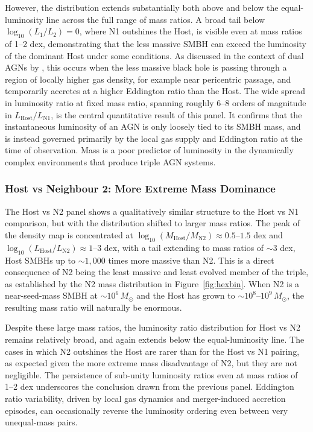 \documentclass[twocolumn, 10pt]{article}
\begin{document}
However, the distribution extends substantially both above and below the equal-luminosity line across the full range of mass ratios. A broad tail below $\log_{10}(L_1/L_2) = 0$, where N1 outshines the Host, is visible even at mass ratios of 1--2 dex, demonstrating that the less massive SMBH can exceed the luminosity of the dominant Host under some conditions. As discussed in the context of dual AGNs by \citet{Saeedzadeh2024}, this occurs when the less massive black hole is passing through a region of locally higher gas density, for example near pericentric passage, and temporarily accretes at a higher Eddington ratio than the Host. The wide spread in luminosity ratio at fixed mass ratio, spanning roughly 6--8 orders of magnitude in $L_\mathrm{Host}/L_\mathrm{N1}$, is the central quantitative result of this panel. It confirms that the instantaneous luminosity of an AGN is only loosely tied to its SMBH mass, and is instead governed primarily by the local gas supply and Eddington ratio at the time of observation. Mass is a poor predictor of luminosity in the dynamically complex environments that produce triple AGN systems.
 
\subsubsection{Host vs Neighbour 2: More Extreme Mass Dominance}
\label{subsubsec:ratio_hostn2}
 
The Host vs N2 panel shows a qualitatively similar structure to the Host vs N1 comparison, but with the distribution shifted to larger mass ratios. The peak of the density map is concentrated at $\log_{10}(M_\mathrm{Host}/M_\mathrm{N2}) \approx 0.5$--$1.5$ dex and $\log_{10}(L_\mathrm{Host}/L_\mathrm{N2}) \approx 1$--$3$ dex, with a tail extending to mass ratios of $\sim 3$ dex, Host SMBHs up to $\sim 1{,}000$ times more massive than N2. This is a direct consequence of N2 being the least massive and least evolved member of the triple, as established by the N2 mass distribution in Figure~\ref{fig:hexbin}. When N2 is a near-seed-mass SMBH at $\sim 10^6\,M_\odot$ and the Host has grown to $\sim 10^8$--$10^9\,M_\odot$, the resulting mass ratio will naturally be enormous.
 
Despite these large mass ratios, the luminosity ratio distribution for Host vs N2 remains relatively broad, and again extends below the equal-luminosity line. The cases in which N2 outshines the Host are rarer than for the Host vs N1 pairing, as expected given the more extreme mass disadvantage of N2, but they are not negligible. The persistence of sub-unity luminosity ratios even at mass ratios of 1--2 dex underscores the conclusion drawn from the previous panel. Eddington ratio variability, driven by local gas dynamics and merger-induced accretion episodes, can occasionally reverse the luminosity ordering even between very unequal-mass pairs.
 
\end{document}
